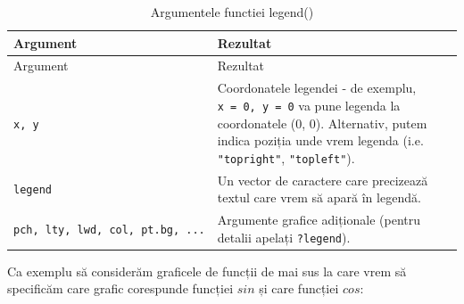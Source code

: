 \documentclass[]{article}
\begin{document}
\begin{longtable}[]{@{}ll@{}}
\caption{Argumentele functiei legend()}\tabularnewline
\toprule
\begin{minipage}[b]{0.14\columnwidth}\raggedright\strut
Argument\strut
\end{minipage} & \begin{minipage}[b]{0.71\columnwidth}\raggedright\strut
Rezultat\strut
\end{minipage}\tabularnewline
\midrule
\endfirsthead
\toprule
\begin{minipage}[b]{0.14\columnwidth}\raggedright\strut
Argument\strut
\end{minipage} & \begin{minipage}[b]{0.71\columnwidth}\raggedright\strut
Rezultat\strut
\end{minipage}\tabularnewline
\midrule
\endhead
\begin{minipage}[t]{0.14\columnwidth}\raggedright\strut
\texttt{x,\ y}\strut
\end{minipage} & \begin{minipage}[t]{0.71\columnwidth}\raggedright\strut
Coordonatele legendei - de exemplu, \texttt{x\ =\ 0,\ y\ =\ 0} va pune
legenda la coordonatele (0, 0). Alternativ, putem indica poziția unde
vrem legenda (i.e. \texttt{"topright"}, \texttt{"topleft"}).\strut
\end{minipage}\tabularnewline
\begin{minipage}[t]{0.14\columnwidth}\raggedright\strut
\texttt{legend}\strut
\end{minipage} & \begin{minipage}[t]{0.71\columnwidth}\raggedright\strut
Un vector de caractere care precizează textul care vrem să apară în
legendă.\strut
\end{minipage}\tabularnewline
\begin{minipage}[t]{0.14\columnwidth}\raggedright\strut
\texttt{pch,\ lty,\ lwd,\ col,\ pt.bg,\ ...}\strut
\end{minipage} & \begin{minipage}[t]{0.71\columnwidth}\raggedright\strut
Argumente grafice adiționale (pentru detalii apelați
\texttt{?legend}).\strut
\end{minipage}\tabularnewline
\bottomrule
\end{longtable}

Ca exemplu să considerăm graficele de funcții de mai sus la care vrem să
specificăm care grafic corespunde funcției \(sin\) și care funcției
\(cos\):
\end{document}
